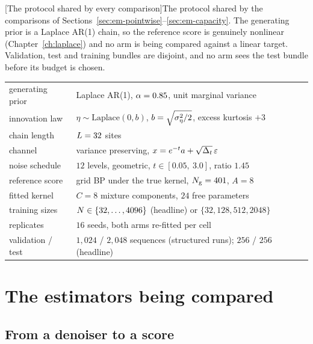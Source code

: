 \begin{center}
\begin{minipage}{\linewidth}\small\centering
{}[The protocol shared by every comparison]{The protocol shared
by the comparisons of Sections~\ref{sec:em-pointwise}--\ref{sec:em-capacity}.
The generating prior is a Laplace AR(1) chain, so the reference score is
genuinely nonlinear (Chapter~\ref{ch:laplace}) and no arm is being compared
against a linear target. Validation, test and training bundles are disjoint,
and no arm sees the test bundle before its budget is chosen.}
\label{tab:em-protocol}
\begin{tabular}{@{}ll@{}}
\toprule
generating prior & Laplace AR(1), $\alpha = 0.85$, unit marginal variance \\
innovation law & $\eta \sim \mathrm{Laplace}(0, b)$, $b = \sqrt{\sigma_\eta^2/2}$, excess kurtosis $+3$ \\
chain length & $L = 32$ sites \\
channel & variance preserving, $x = e^{-t}a + \sqrt{\Delta_t}\,\varepsilon$ \\
noise schedule & $12$ levels, geometric, $t \in [0.05,\ 3.0]$, ratio $1.45$ \\
reference score & grid BP under the true kernel, $N_{\mathrm{g}} = 401$, $A = 8$ \\
fitted kernel & $C = 8$ mixture components, $24$ free parameters \\
training sizes & $N \in \{32, \dots, 4096\}$ (headline) or $\{32,128,512,2048\}$ \\
replicates & $16$ seeds, both arms re-fitted per cell \\
validation / test & $1{,}024$ / $2{,}048$ sequences (structured runs); $256$ / $256$ (headline) \\
\bottomrule
\end{tabular}
\end{minipage}
\end{center}

\section{The estimators being compared}\label{sec:em-estimators}

\subsection{From a denoiser to a score}

